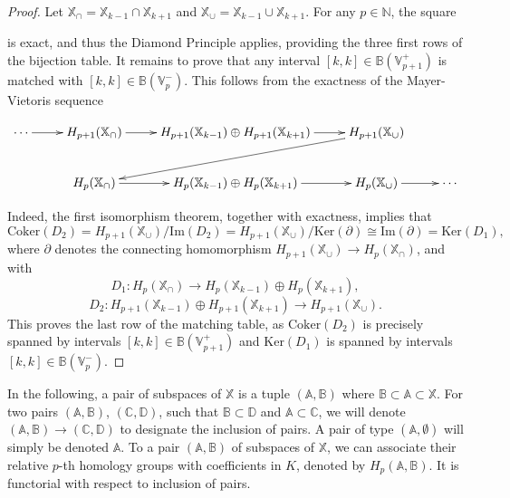 \documentclass[11pt]{article}
\theoremstyle{remark}
\newcommand{\N}{\mathbb{N}}
\newcommand{\V}{\mathbb{V}}
\newcommand{\X}{\mathbb{X}}
\newcommand{\B}{\mathbb{B}}
\begin{document}
\begin{proof}
Let $\X_\cap=\X_{k-1}\cap \X_{k+1}$ and $\X_\cup=\X_{k-1}\cup \X_{k+1}$. For any $p\in\N$, the square \begin{center}
\end{center}
is exact, and thus the Diamond Principle applies, providing the three first rows of the bijection table. It remains to prove that any interval $[k,k]\in \B({\V_{p+1}^+})$ is matched with $[k,k]\in \B({\V_p^-})$. This follows from the exactness of the Mayer-Vietoris sequence 



\[ \xymatrix{ \cdots \ar[r]& H_{p+1}(\X_\cap) \ar[r]& H_{p+1}(\X_{k-1})\oplus H_{p+1}(\X_{k+1})\ar[r] & H_{p+1}(\X_\cup) \ar[dll]  \\
&   H_{p}(\X_\cap)  \ar[r]  & H_{p}(\X_{k-1})\oplus H_{p}(\X_{k+1}) \ar[r]& H_{p}(\X_\cup) \ar[r]& \cdots \\
}
\]



Indeed, the first isomorphism theorem, together with exactness, implies that 
$$\mathrm{Coker}(D_2)=H_{p+1}(\X_\cup)/\mathrm{Im}(D_2)= H_{p+1}(\X_\cup)/\mathrm{Ker}(\partial)\cong \mathrm{Im}(\partial)=\mathrm{Ker}(D_1),$$ where $\partial$ denotes the connecting homomorphism $H_{p+1}(\X_\cup)\rightarrow H_{p}(\X_\cap)$, and with $$D_1:H_p(\X_\cap)\rightarrow H_{p}(\X_{k-1})\oplus H_{p}(\X_{k+1}),$$ 
$$D_2:H_{p+1}(\X_{k-1})\oplus H_{p+1}(\X_{k+1})\rightarrow H_{p+1}(\X_\cup).$$ This proves the last row of the matching table, as $\mathrm{Coker}(D_2)$ is precisely spanned by intervals $[k,k]\in\B({\V_{p+1}^+})$ and $\mathrm{Ker}(D_1)$ is spanned by intervals $[k,k]\in\B({\V_{p}^-})$.
\end{proof}

In the following, a pair of subspaces of $\mathbb{X}$ is a tuple $(\mathbb{A}, \mathbb{B})$ where $\mathbb{B} \subset \mathbb{A} \subset \mathbb{X}$. For two pairs $(\mathbb{A}, \mathbb{B})$, $(\mathbb{C}, \mathbb{D})$, such that $\mathbb{B} \subset \mathbb{D}$ and $\mathbb{A} \subset \mathbb{C}$, we will denote $(\mathbb{A}, \mathbb{B}) \longrightarrow (\mathbb{C}, \mathbb{D}) $ to designate the inclusion of pairs. A pair of type $(\mathbb{A}, \emptyset)$ will simply be denoted $\mathbb{A}$. To a pair $(\mathbb{A}, \mathbb{B})$ of subspaces of $\mathbb{X}$, we can associate their relative $p$-th homology groups with coefficients in $K$, denoted by $H_p(\mathbb{A},\mathbb{B})$. It is functorial with respect to inclusion of pairs. 
\end{document}
